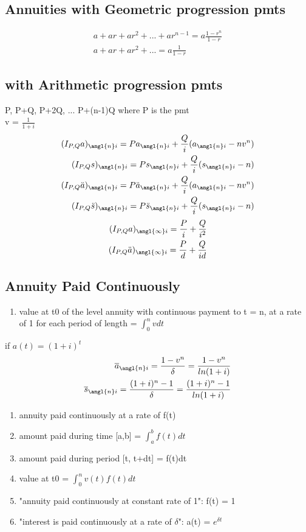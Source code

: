 \documentclass[12pt]{article}
\begin{document}
\subsection{Annuities with Geometric progression pmts}
\begin{align}
	a + ar + ar^2 + ... + ar^{n-1} = a \frac{1-r^n}{1 - r} \nonumber \\
	a + ar + ar^2 + ... = a \frac{1}{1-r} \nonumber
\end{align}

\subsection{with Arithmetic progression pmts}
P, P+Q, P+2Q, ... P+(n-1)Q where P is the pmt \\
v = $\frac{1}{1+i}$ 
\begin{align}
	(I_{P,Q}a)_{\angl{n}i} = Pa_{\angl{n}i} + \frac{Q}{i}(a_{\angl{n}i} - nv^n) \nonumber \\	
	(I_{P,Q}s)_{\angl{n}i} = Ps_{\angl{n}i} + \frac{Q}{i}(s_{\angl{n}i} - n) \nonumber \\
	(I_{P,Q}\ddot{a})_{\angl{n}i} = P\ddot{a}_{\angl{n}i} + \frac{Q}{i}(a_{\angl{n}i} - nv^n) \nonumber \\	
	(I_{P,Q}\ddot{s})_{\angl{n}i} = P\ddot{s}_{\angl{n}i} + \frac{Q}{i}(s_{\angl{n}i} - n) \nonumber 
\end{align}
\begin{align}
	(I_{P,Q}a)_{\angl{\infty}i} = \frac{P}{i} + \frac{Q}{i^2} \nonumber \\		
	(I_{P,Q}\ddot{a})_{\angl{\infty}i} = \frac{P}{d} + \frac{Q}{id} \nonumber
\end{align}

\subsection{Annuity Paid Continuously}
\begin{enumerate}
	\item value at t0 of the level annuity with continuous payment to t = n, at a rate of 1 for each period of length = $\int_{0}^{n} v dt$
\end{enumerate}
if $a(t) = (1+i)^t$
\begin{align}
	\overline{a}_{\angl{n}i} = \frac{1-v^n}{\delta} = \frac{1-v^n}{ln(1+i)} \nonumber \\
	\overline{s}_{\angl{n}i} = \frac{(1+i)^n - 1}{\delta} = \frac{(1+i)^n - 1}{ln(1+i)} \nonumber
\end{align}
\begin{enumerate}
	\item annuity paid continuously at a rate of f(t)
	\item amount paid during time [a,b] = $\int_{a}^{b} f(t)dt$
	\item amount paid during period [t, t+dt] = f(t)dt
	\item value at t0 = $\int_{0}^{n}v(t)f(t)dt$
	\item "annuity paid continuously at constant rate of 1": f(t) = 1
	\item "interest is paid continuously at a rate of $\delta$": a(t) = $e^{\delta t }$
\end{enumerate}
\end{document}
